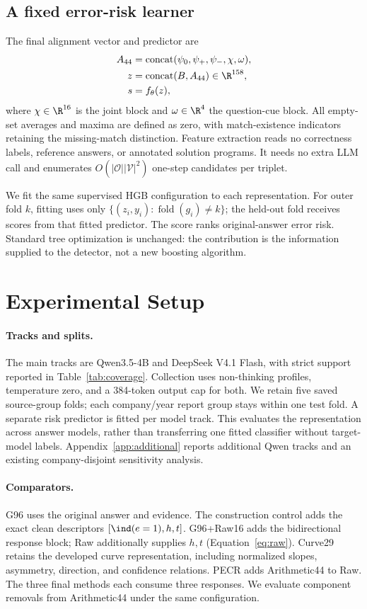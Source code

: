\subsection{A fixed error-risk learner}
The final alignment vector and predictor are
\begin{align}
 A_{44}&=\operatorname{concat}(\psi_0,\psi_+,\psi_-,\chi,\omega),\\
 z&=\operatorname{concat}(B,A_{44})\in\R^{158},\\
 s&=f_\theta(z),
 \label{eq:risk}
\end{align}
where $\chi\in\R^{16}$ is the joint block and $\omega\in\R^4$ the question-cue block. All empty-set averages and maxima are defined as zero, with match-existence indicators retaining the missing-match distinction. Feature extraction reads no correctness labels, reference answers, or annotated solution programs. It needs no extra LLM call and enumerates $O(|\mathcal O||\mathcal V|^2)$ one-step candidates per triplet.

We fit the same supervised HGB configuration to each representation. For outer fold $k$, fitting uses only $\{(z_i,y_i):\operatorname{fold}(g_i)\neq k\}$; the held-out fold receives scores from that fitted predictor. The score ranks original-answer error risk. Standard tree optimization is unchanged: the contribution is the information supplied to the detector, not a new boosting algorithm.

\section{Experimental Setup}
\label{sec:settings}
\paragraph{Tracks and splits.}
The main tracks are Qwen3.5-4B and DeepSeek V4.1 Flash, with strict support reported in Table~\ref{tab:coverage}. Collection uses non-thinking profiles, temperature zero, and a 384-token output cap for both. We retain five saved source-group folds; each company/year report group stays within one test fold. A separate risk predictor is fitted per model track. This evaluates the representation across answer models, rather than transferring one fitted classifier without target-model labels. Appendix~\ref{app:additional} reports additional Qwen tracks and an existing company-disjoint sensitivity analysis.

\paragraph{Comparators.}
G96 uses the original answer and evidence. The construction control adds the exact clean descriptors $[\ind(e=1),h,t]$. G96+Raw16 adds the bidirectional response block; Raw additionally supplies $h,t$ (Equation~\ref{eq:raw}). Curve29 retains the developed curve representation, including normalized slopes, asymmetry, direction, and confidence relations. PECR adds Arithmetic44 to Raw. The three final methods each consume three responses. We evaluate component removals from Arithmetic44 under the same configuration.

